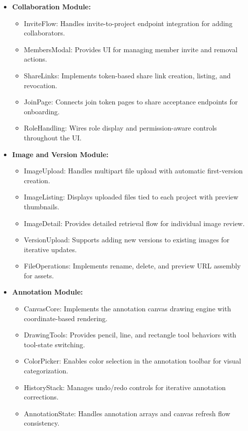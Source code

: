 \documentclass[12pt,a4paper]{article}
\begin{document}
\begin{itemize}
    \item[\textbf{$\triangleright$}] \textbf{Collaboration Module:}
    \begin{itemize}
        \item InviteFlow: Handles invite-to-project endpoint integration for adding collaborators.
        \item MembersModal: Provides UI for managing member invite and removal actions.
        \item ShareLinks: Implements token-based share link creation, listing, and revocation.
        \item JoinPage: Connects join token pages to share acceptance endpoints for onboarding.
        \item RoleHandling: Wires role display and permission-aware controls throughout the UI.
    \end{itemize}

    \item[\textbf{$\triangleright$}] \textbf{Image and Version Module:}
    \begin{itemize}
        \item ImageUpload: Handles multipart file upload with automatic first-version creation.
        \item ImageListing: Displays uploaded files tied to each project with preview thumbnails.
        \item ImageDetail: Provides detailed retrieval flow for individual image review.
        \item VersionUpload: Supports adding new versions to existing images for iterative updates.
        \item FileOperations: Implements rename, delete, and preview URL assembly for assets.
    \end{itemize}

    \item[\textbf{$\triangleright$}] \textbf{Annotation Module:}
    \begin{itemize}
        \item CanvasCore: Implements the annotation canvas drawing engine with coordinate-based rendering.
        \item DrawingTools: Provides pencil, line, and rectangle tool behaviors with tool-state switching.
        \item ColorPicker: Enables color selection in the annotation toolbar for visual categorization.
        \item HistoryStack: Manages undo/redo controls for iterative annotation corrections.
        \item AnnotationState: Handles annotation arrays and canvas refresh flow consistency.
    \end{itemize}


\end{itemize}
\end{document}
